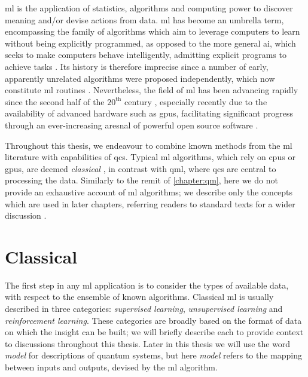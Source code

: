 \glsresetall
\Gls{ml} is the application of statistics, algorithms and computing power to discover meaning and/or devise actions from data.
\gls{ml} has become an umbrella term, encompassing the family of algorithms
    which aim to leverage computers to learn without being explicitly programmed,
    as opposed to the more general \gls{ai}, which seeks to make computers behave intelligently,
    admitting explicit programs to achieve tasks \cite{MLvAI}.
Its history is therefore imprecise since a number of early, apparently unrelated algorithms were proposed independently, 
    which now constitute \gls{ml} routines \cite{mcculloch1943logical, turing2009computing}. 
Nevertheless, the field of \gls{ml} has been advancing rapidly since the second half of the $20^{\textrm{th}}$ century \cite{russell2002artificial}, 
    especially recently due to the availability of advanced hardware such as \glspl{gpu}, 
    facilitating significant progress through an ever-increasing aresnal of powerful open source software \cite{pedregosa2011scikit, abadi2016tensorflow, paszke2019pytorch}. 
\par 

Throughout this thesis, we endeavour to combine known methods from the \gls{ml} literature with capabilities of \glspl{qc}\footnotemark. 
Typical \gls{ml} algorithms, which rely on \glspl{cpu} or \glspl{gpu}, are deemed \emph{classical} ,
    in contrast with \gls{qml}, where \glspl{qc} are central to processing the data.
Similarly to the remit of \cref{chapter:qm}, here we do not provide an exhaustive account of \gls{ml} algorithms;
    we describe only the concepts which are used in later chapters, 
    referring readers to standard texts for a wider discussion \cite{russell2002artificial, hastie2009elements}.



\section{Classical }\label{sec:classical_ml}

The first step in any \gls{ml} application is to consider the types of available data,
    with respect to the ensemble of known algorithms. 
Classical \gls{ml} is usually described in three categories:
    \emph{supervised learning}, \emph{unsupervised learning} and \emph{reinforcement learning}.  
These categories are broadly based on the format of data on which the insight can be built;
    we will briefly describe each to provide context to discussions throughout this thesis. 
Later in this thesis we will use the word \emph{model} for descriptions of quantum systems, 
    but here \emph{model} refers to the mapping between inputs and outputs, devised by the \gls{ml} algorithm.
\par 

